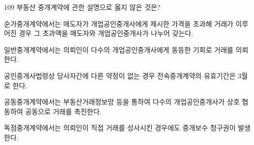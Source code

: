 \begin{question}{109}
부동산 중개계약에 관한 설명으로 옳지 않은 것은?
\begin{choices}
  \item 순가중개계약에서는 매도자가 개업공인중개사에게 제시한 가격을 초과해 거래가 이루어진 경우 그 초과액을 매도자와 개업공인중개사가 나누어 갖는다.
  \item 일반중개계약에서는 의뢰인이 다수의 개업공인중개사에게 동등한 기회로 거래를 의뢰한다.
  \item 공인중개사법령상 당사자간에 다른 약정이 없는 경우 전속중개계약의 유효기간은 3월로 한다.
  \item 공동중개계약에서는 부동산거래정보망 등을 통하여 다수의 개업공인중개사가 상호 협동하여 공동으로 거래를 촉진한다.
  \item 독점중개계약에서는 의뢰인이 직접 거래를 성사시킨 경우에도 중개보수 청구권이 발생한다.
\end{choices}
\end{question}
